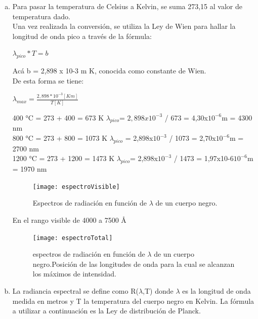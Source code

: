 \documentclass[10pt,a4paper]{article}
\begin{document}
\begin{enumerate}[a)]
    \item Para pasar la temperatura de Celsius a Kelvin, se suma 273,15 al valor de temperatura dado.\\
    Una vez realizada la conversión, se utiliza la Ley de Wien para hallar la longitud de onda pico a través de la fórmula:
\begin{center}
$\lambda _{pico} * T  = b$
\end{center}
Acá b = 2,898 x 10-3 m K,  conocida como constante de Wien.\\

De esta forma se tiene:\\
\begin{center}
$\lambda _{max} = \frac{2,898 * 10^{-3} [Km]}{T[K]}$
\end{center}

400 °C = 273 + 400 = 673 K		$\lambda_{pico} $= $2,898x10^{-3}$ / 673 = 4,30x$10^{-6}$m = 4300 nm\\

800 °C = 273 + 800 = 1073 K		$\lambda_{pico}$ = 2,898x$10^{-3}$ / 1073 = 2,70x$10^{-6}$m = 2700 nm\\

1200 °C = 273 + 1200 = 1473 K	$\lambda_{pico} $= 2,898x$10^{-3}$ / 1473 = 1,97x10-6$10^{-6}$m = 1970 nm\\

\begin{figure}[H]
  \centering
    \texttt{[image: espectroVisible]}
    \caption{Espectros de radiación en función de $\lambda$ de un cuerpo negro.}
  \label{fig:fuente}
\end{figure}

\newpage
 En el rango visible de 4000 a 7500  Å
\begin{figure}[H]
  \centering
    \texttt{[image: espectroTotal]}
    \caption{espectros de radiación en función de $\lambda$ de un cuerpo negro.Posición de las longitudes de onda para la cual se alcanzan los máximos de intensidad.}
  \label{fig:fuente}
\end{figure}

\newpage

\item La radiancia espectral se define como R($\lambda$,T) donde $\lambda$ es la longitud de onda medida en metros y T la temperatura del cuerpo negro en Kelvin. La fórmula a utilizar a continuación es la Ley de distribución de Planck. \\


\end{enumerate}
\end{document}
